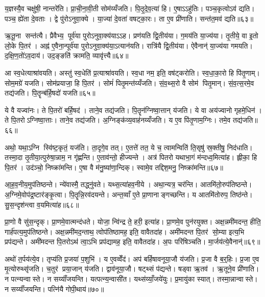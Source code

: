 य॒ज्ञस्यै॒व चक्षु॑षी॒ नान्तरे॑ति। प्रा॒ची॒ना॒वी॒ती सोम॑य्यँजति। पि॒तृ॒दे॒व॒त्या॑ हि। ए॒षाऽऽहु॑तिः। पञ्च॒कृत्वोऽव॑ द्यति। पञ्च॒ ह्ये॑ता दे॒वताः। द्वे पु॑रोऽनुवा॒क्ये। या॒ज्या॑ दे॒वता॑ वषट्का॒रः। ता ए॒व प्री॑णाति। सन्त॑त॒मव॑ द्यति॥६३॥

ऋ॒तू॒ना सन्त॑त्यै। प्रैवैभ्य॒ पूर्व॑या पुरोऽनुवा॒क्य॑याऽऽह। प्रण॑यति द्वि॒तीय॑या। ग॒मय॑ति या॒ज्य॑या। तृ॒तीये॒ वा इ॒तो लो॒के पि॒तर॑। अह्न॑ ए॒वैना॒न्पूर्व॑या पुरोऽनुवा॒क्य॑या॒ऽत्यान॑यति। रात्रि॑यै द्वि॒तीय॑या। ऐवैनान्॑ या॒ज्य॑या गमयति। द॒क्षि॒ण॒तो॑ऽव॒दाय॑। उद॒ङ्ङति॑ क्रामति॒ व्यावृ॑त्त्यै॥६४॥

आ स्व॒धेत्याश्रा॑वयति। अस्तु॑ स्व॒धेति॑ प्र॒त्याश्रा॑वयति। स्व॒धा नम॒ इति॒ वष॑ट्करोति। स्व॒धा॒का॒रो हि पि॑तृ॒णाम्। सोम॒मग्रे॑ यजति। सोम॑प्रयाजा॒ हि पि॒तर॑। सोमं॑ पितृ॒मन्त॑य्यँजति। सं॒व॒थ्स॒रो वै सोम॑ पितृ॒मान्। सं॒व॒त्स॒रमे॒व तद्य॑जति। पि॒तॄन्ब॑र्\mbox{}हि॒षदो॑ यजति॥६५॥

ये वै यज्वा॑नः। ते पि॒तरो॑ बर्\mbox{}हि॒षद॑। ताने॒व तद्य॑जति। पि॒तॄन॑ग्निष्वा॒त्तान् य॑जति। ये वा अय॑ज्वानो गृहमे॒धिन॑। ते पि॒तरोऽग्निष्वा॒त्ताः। ताने॒व तद्य॑जति। अ॒ग्निङ्क॑व्य॒वाह॑नय्यँजति। य ए॒व पि॑तृ॒णाम॒ग्निः। तमे॒व तद्य॑जति॥६६॥

अथो॒ यथा॒ऽग्नि स्वि॑ष्ट॒कृतं॒ यज॑ति। ता॒दृगे॒व तत्। ए॒तत्ते॑ तत॒ ये च॒ त्वामन्विति॑ ति॒सृषु॑ स्र॒क्तीषु॒ निद॑धाति। तस्मा॒दा तृ॒तीया॒त्पुरु॑षा॒न्नाम॒ न गृ॑ह्णन्ति। ए॒ताव॑न्तो॒ हीज्यन्ते। अत्र॑ पितरो यथाभा॒गं म॑न्दध्व॒मित्या॑ह। ह्लीका॒ हि पि॒तर॑। उद॑ञ्चो॒ निष्क्रा॑मन्ति। ए॒षा वै म॑नु॒ष्या॑णा॒न्दिक्। स्वामे॒व तद्दिश॒मनु॒ निष्क्रा॑मन्ति॥६७॥

आ॒ह॒व॒नीय॒मुप॑तिष्ठन्ते। न्ये॑वास्मै॒ तद्ध्नु॑वते। यथ्स॒त्या॑हव॒नीये। अथा॒न्यत्र॒ चर॑न्ति। आतमि॑तो॒रुप॑तिष्ठन्ते। अ॒ग्निमे॒वोप॑द्र॒ष्टार॑ङ्कृ॒त्वा। पि॒तॄन्नि॒रव॑दयन्ते। अन्त॒व्वाँ ए॒ते प्रा॒णानाङ्गच्छन्ति। य आतमि॑तोरुप॒ तिष्ठ॑न्ते। सु॒स॒न्दृश॑न्त्वा व॒यमित्या॑ह॥६८॥

प्रा॒णो वै सु॑स॒न्दृक्। प्रा॒णमे॒वात्मन्द॑धते। योजा॒ न्वि॑न्द्र ते॒ हरी॒ इत्या॑ह। प्रा॒णमे॒व पुन॑रयुक्त। अक्ष॒न्नमी॑मदन्त॒ हीति॒ गार्\mbox{}ह॑पत्य॒मुप॑तिष्ठन्ते। अक्ष॒न्नमी॑मद॒न्ताथ॒ त्वोप॑तिष्ठामह॒ इति॒ वावैतदा॑ह। अमी॑मदन्त पि॒तर॑ सो॒म्या इत्य॒भि प्रप॑द्यन्ते। अमी॑मदन्त पि॒तरोऽथ॑ त्वा॒ऽभि प्रप॑द्यामह॒ इति॒ वावैतदा॑ह। अ॒पः परि॑षिञ्चति। मा॒र्जय॑त्ये॒वैनान्॑॥६९॥

अथो॑ त॒र्पय॑त्ये॒व। तृप्य॑ति प्र॒जया॑ प॒शुभि॑। य ए॒वव्वेँद॑। अप॑ बर्\mbox{}हिषावनूया॒जौ य॑जति। प्र॒जा वै ब॒र्॒हिः। प्र॒जा ए॒व मृ॒त्योरुथ्सृ॑जति। च॒तुर॑ प्रया॒जान् य॑जति। द्वाव॑नूया॒जौ। षट्थ्सं प॑द्यन्ते। षड्वा ऋ॒तव॑। ऋ॒तूने॒व प्री॑णाति। न पत्न्यन्वास्ते। न सय्याँ॑जयन्ति। यत्पत्न्य॒न्वासी॑त। यथ्स॑य्याँ॒जये॑युः। प्र॒मायु॑का स्यात्। तस्मा॒न्नान्वास्ते। न सय्याँ॑जयन्ति। पत्नि॑यै गोपी॒थाय॑॥७०॥

